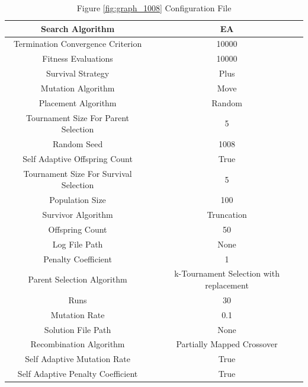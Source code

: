 \documentclass{standalone}
\begin{document}
\begin{table}[!htb]
	\centering
	\caption{Figure \ref{fig:graph_1008} Configuration File}
	\label{tab:graph_1008}
	\begin{tabular}{| c | c |}
		\hline
		Search Algorithm		& EA		 \\
		\hline
		Termination Convergence Criterion		& 10000		 \\
		\hline
		Fitness Evaluations		& 10000		 \\
		\hline
		Survival Strategy		& Plus		 \\
		\hline
		Mutation Algorithm		& Move		 \\
		\hline
		Placement Algorithm		& Random		 \\
		\hline
		Tournament Size For Parent Selection		& 5		 \\
		\hline
		Random Seed		& 1008		 \\
		\hline
		Self Adaptive Offspring Count		& True		 \\
		\hline
		Tournament Size For Survival Selection		& 5		 \\
		\hline
		Population Size		& 100		 \\
		\hline
		Survivor Algorithm		& Truncation		 \\
		\hline
		Offspring Count		& 50		 \\
		\hline
		Log File Path		& None		 \\
		\hline
		Penalty Coefficient		& 1		 \\
		\hline
		Parent Selection Algorithm		& k-Tournament Selection with replacement		 \\
		\hline
		Runs		& 30		 \\
		\hline
		Mutation Rate		& 0.1		 \\
		\hline
		Solution File Path		& None		 \\
		\hline
		Recombination Algorithm		& Partially Mapped Crossover		 \\
		\hline
		Self Adaptive Mutation Rate		& True		 \\
		\hline
		Self Adaptive Penalty Coefficient		& True		 \\
		\hline
	\end{tabular}
\end{table}
\end{document}
